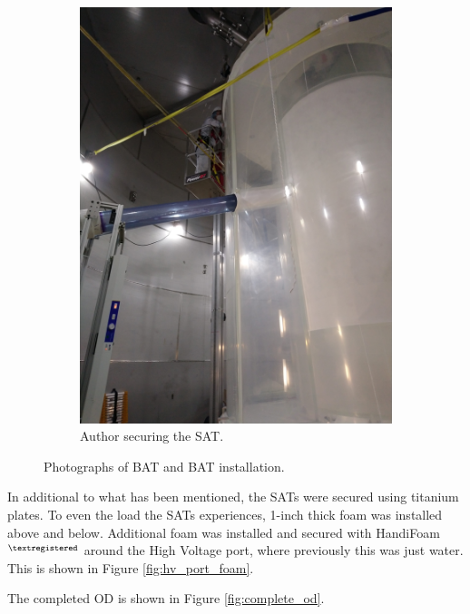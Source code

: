 \begin{figure}[!htbp]
\begin{subfigure}{.5\textwidth}
  \includegraphics[width=\linewidth]{Figures/Construction/SAT_titanium_plate.JPG}
  \caption{Author securing the SAT.}
  \label{fig:SAT_titanium_installation}
  \end{subfigure}
\caption{Photographs of BAT and BAT installation.}
\label{fig:sat_and_bat_installation}
\end{figure}

\par
In additional to what has been mentioned, the SATs were secured using titanium plates.
To even the load the SATs experiences, 1-inch thick foam was installed above and below.
Additional foam was installed and secured with HandiFoam$^{\textregistered}$ around the High Voltage port, where previously this was just water.
This is shown in Figure \ref{fig:hv_port_foam}.

\par
The completed OD is shown in Figure \ref{fig:complete_od}.

